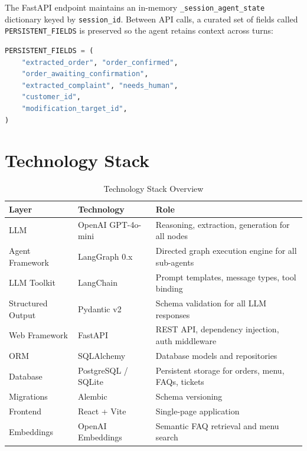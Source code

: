 \documentclass[12pt,a4paper]{report}
\begin{document}
The FastAPI endpoint maintains an in-memory \texttt{\_session\_agent\_state} dictionary
keyed by \texttt{session\_id}. Between API calls, a curated set of fields called
\texttt{PERSISTENT\_FIELDS} is preserved so the agent retains context across turns:

\begin{lstlisting}[language=Python, caption={Persistent fields in the chat endpoint}]
PERSISTENT_FIELDS = (
    "extracted_order", "order_confirmed",
    "order_awaiting_confirmation",
    "extracted_complaint", "needs_human",
    "customer_id",
    "modification_target_id",
)
\end{lstlisting}

\chapter{Technology Stack}\label{ch:tech}

\begin{table}[H]
\centering
\caption{Technology Stack Overview}
\begin{tabularx}{\textwidth}{llX}
\toprule
\textbf{Layer} & \textbf{Technology} & \textbf{Role} \\
\midrule
LLM              & OpenAI GPT-4o-mini     & Reasoning, extraction, generation for all nodes \\
Agent Framework  & LangGraph 0.x          & Directed graph execution engine for all sub-agents \\
LLM Toolkit      & LangChain              & Prompt templates, message types, tool binding \\
Structured Output & Pydantic v2           & Schema validation for all LLM responses \\
Web Framework    & FastAPI                & REST API, dependency injection, auth middleware \\
ORM              & SQLAlchemy             & Database models and repositories \\
Database         & PostgreSQL / SQLite    & Persistent storage for orders, menu, FAQs, tickets \\
Migrations       & Alembic                & Schema versioning \\
Frontend         & React + Vite           & Single-page application \\
Embeddings       & OpenAI Embeddings      & Semantic FAQ retrieval and menu search \\
\bottomrule
\end{tabularx}
\end{table}
\end{document}
